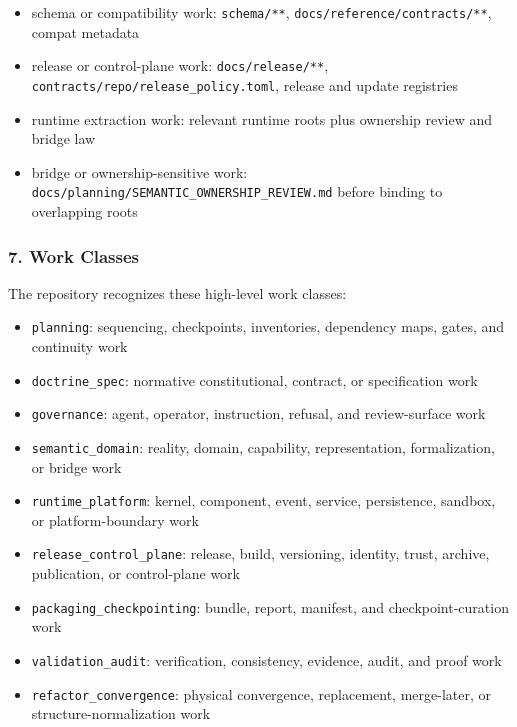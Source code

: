 \documentclass[9pt,a4paper,openany]{book}
\begin{document}
\begin{itemize}
\item schema or compatibility work: \texttt{schema/\allowbreak{}**}, \texttt{docs/\allowbreak{}reference/\allowbreak{}contracts/\allowbreak{}**}, compat metadata
\item release or control-\allowbreak{}plane work: \texttt{docs/\allowbreak{}release/\allowbreak{}**}, \texttt{contracts/\allowbreak{}repo/\allowbreak{}release\_\allowbreak{}policy.\allowbreak{}toml}, release and update registries
\item runtime extraction work: relevant runtime roots plus ownership review and bridge law
\item bridge or ownership-\allowbreak{}sensitive work: \texttt{docs/\allowbreak{}planning/\allowbreak{}SEMANTIC\_\allowbreak{}OWNERSHIP\_\allowbreak{}REVIEW.\allowbreak{}md} before binding to overlapping roots
\end{itemize}

\subsubsection{7. Work Classes}

The repository recognizes these high-\allowbreak{}level work classes:


\begin{itemize}
\item \texttt{planning}: sequencing, checkpoints, inventories, dependency maps, gates, and continuity work
\item \texttt{doctrine\_\allowbreak{}spec}: normative constitutional, contract, or specification work
\item \texttt{governance}: agent, operator, instruction, refusal, and review-\allowbreak{}surface work
\item \texttt{semantic\_\allowbreak{}domain}: reality, domain, capability, representation, formalization, or bridge work
\item \texttt{runtime\_\allowbreak{}platform}: kernel, component, event, service, persistence, sandbox, or platform-\allowbreak{}boundary work
\item \texttt{release\_\allowbreak{}control\_\allowbreak{}plane}: release, build, versioning, identity, trust, archive, publication, or control-\allowbreak{}plane work
\item \texttt{packaging\_\allowbreak{}checkpointing}: bundle, report, manifest, and checkpoint-\allowbreak{}curation work
\item \texttt{validation\_\allowbreak{}audit}: verification, consistency, evidence, audit, and proof work
\item \texttt{refactor\_\allowbreak{}convergence}: physical convergence, replacement, merge-\allowbreak{}later, or structure-\allowbreak{}normalization work
\end{itemize}
\end{document}
